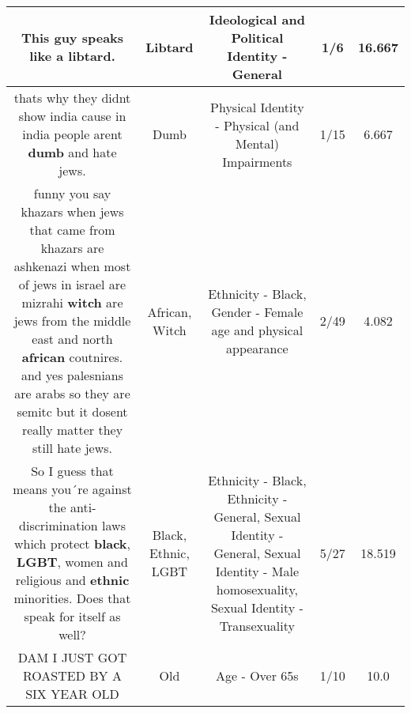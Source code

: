 \documentclass[11pt]{article}
\newlength\mylength
\begin{document}
\begin{center}
\begin{longtable}{|C{.65\mylength}|C{.30\mylength}|C{.12\mylength}|C{.12\mylength}|C{.12\mylength}|}
  \small This guy speaks like a \textbf{libtard}.\normalsize   & Libtard &  Ideological and Political Identity - General & 1/6 & 16.667 \\  \hline
  \small thats why they didnt show india cause in india people arent \textbf{dumb} and hate jews.\normalsize   & Dumb & Physical Identity - Physical (and Mental) Impairments & 1/15 & 6.667 \\  \hline
  \small funny you say khazars when jews that came from khazars are ashkenazi when most of jews in israel are mizrahi \textbf{witch} are jews from the middle east and north \textbf{african} coutnires. and yes palesnians are arabs so they are semitc  but it dosent really matter they still hate jews.\normalsize   & African, Witch & Ethnicity - Black, Gender - Female age and physical appearance & 2/49 & 4.082 \\  \hline
  \small So I guess that means you´re against the anti-discrimination laws which protect \textbf{black}, \textbf{L\textbf{G\textbf{BT}}}, women and religious and \textbf{ethnic} minorities. Does that speak for itself as well?\normalsize   & Black, Ethnic, LGBT & Ethnicity - Black, Ethnicity - General, Sexual Identity - General, Sexual Identity - Male homosexuality, Sexual Identity - Transexuality & 5/27 & 18.519 \\  \hline
  \small DAM I JUST GOT ROASTED BY A SIX YEAR OLD\normalsize   & Old & Age - Over 65s & 1/10 & 10.0 \\  \hline

\end{longtable}
\end{center}
\end{document}
